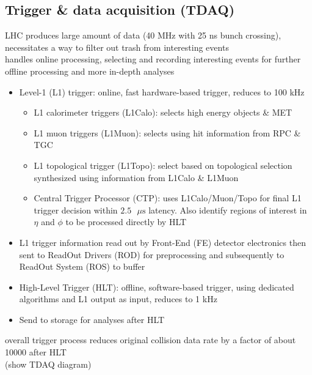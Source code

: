 \documentclass[../thesis.tex]{subfiles}
\begin{document}
\subsection{Trigger \& data acquisition (TDAQ)}
LHC produces large amount of data (40 MHz with 25 ns bunch crossing), necessitates a way to filter out trash from interesting events\\
handles online processing, selecting and recording interesting events for further offline processing and more in-depth analyses\\
\begin{itemize}
\item Level-1 (L1) trigger: online, fast hardware-based trigger, reduces to 100 kHz
\begin{itemize}
\item L1 calorimeter triggers (L1Calo): selects high energy objects \& MET
\item L1 muon triggers (L1Muon): selects using hit information from RPC \& TGC
\item L1 topological trigger (L1Topo): select based on topological selection synthesized using information from L1Calo \& L1Muon
\item Central Trigger Processor (CTP): uses L1Calo/Muon/Topo for final L1 trigger decision within $2.5 \text{ $\mu$s}$ latency. Also identify regions of interest in $\eta$ and $\phi$ to be processed directly by HLT
\end{itemize}
\item L1 trigger information read out by Front-End (FE) detector electronics then sent to ReadOut Drivers (ROD) for preprocessing and subsequently to ReadOut System (ROS) to buffer
\item High-Level Trigger (HLT): offline, software-based trigger, using dedicated algorithms and L1 output as input, reduces to 1 kHz
\item Send to storage for analyses after HLT
\end{itemize}
overall trigger process reduces original collision data rate by a factor of about 10000 after HLT\\
(show TDAQ diagram)
\end{document}
